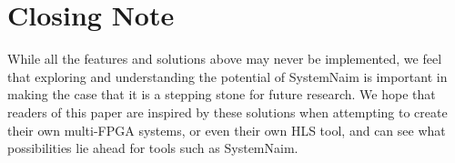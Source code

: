 \section{Closing Note}

While all the features and solutions above may never be implemented, we feel that exploring and understanding the potential of SystemNaim is important in making the case that it is a stepping stone for future research. We hope that readers of this paper are inspired by these solutions when attempting to create their own multi-FPGA systems, or even their own HLS tool, and can see what possibilities lie ahead for tools such as SystemNaim.
